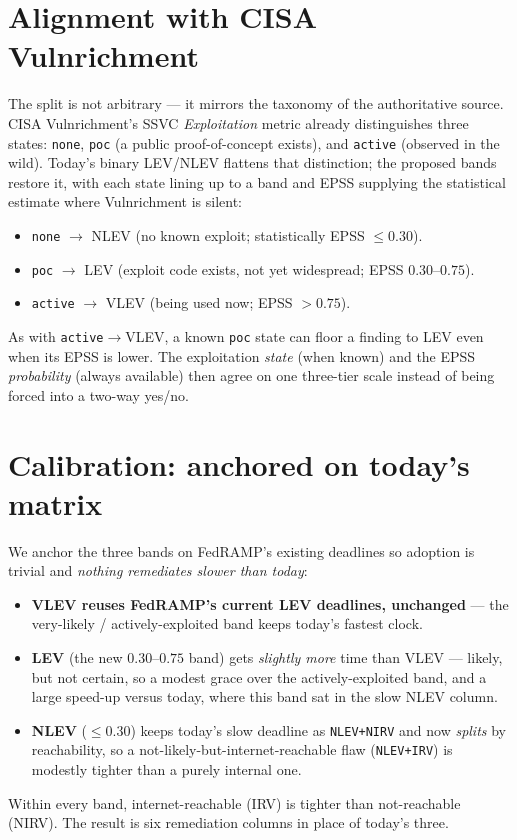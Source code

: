 \documentclass[11pt]{article}
\newcommand{\code}[1]{\texttt{#1}}
\begin{document}
\section{Alignment with CISA Vulnrichment}
The split is not arbitrary --- it mirrors the taxonomy of the authoritative source.
CISA Vulnrichment's SSVC \emph{Exploitation} metric already distinguishes three
states: \code{none}, \code{poc} (a public proof-of-concept exists), and \code{active}
(observed in the wild). Today's binary LEV/NLEV flattens that distinction; the
proposed bands restore it, with each state lining up to a band and EPSS supplying the
statistical estimate where Vulnrichment is silent:
\begin{itemize}[leftmargin=1.5em,nosep,topsep=3pt]
\item \code{none} $\rightarrow$ NLEV (no known exploit; statistically EPSS $\le 0.30$).
\item \code{poc} $\rightarrow$ LEV (exploit code exists, not yet widespread; EPSS $0.30$--$0.75$).
\item \code{active} $\rightarrow$ VLEV (being used now; EPSS $> 0.75$).
\end{itemize}
As with \code{active}$\rightarrow$VLEV, a known \code{poc} state can floor a finding to
LEV even when its EPSS is lower. The exploitation \emph{state} (when known) and the
EPSS \emph{probability} (always available) then agree on one three-tier scale instead
of being forced into a two-way yes/no.

\section{Calibration: anchored on today's matrix}
We anchor the three bands on FedRAMP's existing deadlines so adoption is trivial and
\emph{nothing remediates slower than today}:
\begin{itemize}[leftmargin=1.5em,nosep,topsep=3pt]
\item \textbf{VLEV reuses FedRAMP's current LEV deadlines, unchanged} --- the
  very-likely / actively-exploited band keeps today's fastest clock.
\item \textbf{LEV} (the new $0.30$--$0.75$ band) gets \emph{slightly more} time than
  VLEV --- likely, but not certain, so a modest grace over the actively-exploited
  band, and a large speed-up versus today, where this band sat in the slow NLEV
  column.
\item \textbf{NLEV} ($\le 0.30$) keeps today's slow deadline as \code{NLEV+NIRV} and
  now \emph{splits} by reachability, so a not-likely-but-internet-reachable flaw
  (\code{NLEV+IRV}) is modestly tighter than a purely internal one.
\end{itemize}
Within every band, internet-reachable (IRV) is tighter than not-reachable (NIRV). The
result is six remediation columns in place of today's three.
\end{document}
